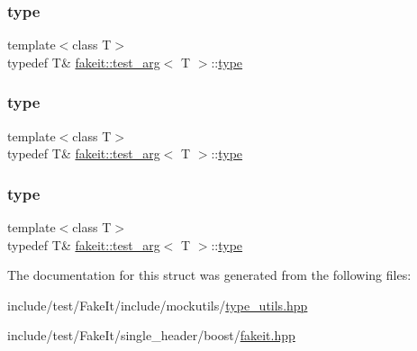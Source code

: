 \subsubsection{\texorpdfstring{type}{type}\hspace{0.1cm}{\footnotesize\ttfamily [7/9]}}
{\footnotesize\ttfamily template$<$class T$>$ \\
typedef T\& \mbox{\hyperlink{structfakeit_1_1test__arg}{fakeit\+::test\+\_\+arg}}$<$ T $>$\+::\mbox{\hyperlink{structfakeit_1_1test__arg_a100a8f745c77f37aad942184679a0399}{type}}}

\mbox{\label{structfakeit_1_1test__arg_a100a8f745c77f37aad942184679a0399}} 
\subsubsection{\texorpdfstring{type}{type}\hspace{0.1cm}{\footnotesize\ttfamily [8/9]}}
{\footnotesize\ttfamily template$<$class T$>$ \\
typedef T\& \mbox{\hyperlink{structfakeit_1_1test__arg}{fakeit\+::test\+\_\+arg}}$<$ T $>$\+::\mbox{\hyperlink{structfakeit_1_1test__arg_a100a8f745c77f37aad942184679a0399}{type}}}

\mbox{\label{structfakeit_1_1test__arg_a100a8f745c77f37aad942184679a0399}} 
\subsubsection{\texorpdfstring{type}{type}\hspace{0.1cm}{\footnotesize\ttfamily [9/9]}}
{\footnotesize\ttfamily template$<$class T$>$ \\
typedef T\& \mbox{\hyperlink{structfakeit_1_1test__arg}{fakeit\+::test\+\_\+arg}}$<$ T $>$\+::\mbox{\hyperlink{structfakeit_1_1test__arg_a100a8f745c77f37aad942184679a0399}{type}}}



The documentation for this struct was generated from the following files\+:\begin{DoxyCompactItemize}
\item 
include/test/\+Fake\+It/include/mockutils/\mbox{\hyperlink{type__utils_8hpp}{type\+\_\+utils.\+hpp}}\item 
include/test/\+Fake\+It/single\+\_\+header/boost/\mbox{\hyperlink{single__header_2boost_2fakeit_8hpp}{fakeit.\+hpp}}\end{DoxyCompactItemize}
